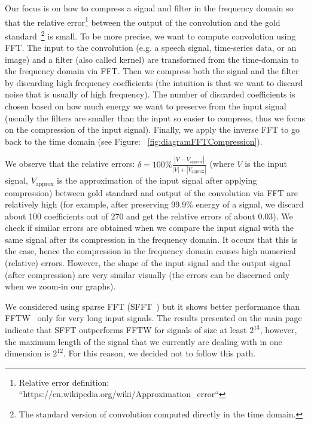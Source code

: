 \label{sec:compression}
Our focus is on how to compress a signal and filter in the frequency domain so that the relative error\footnote{Relative error definition:\\ ``https://en.wikipedia.org/wiki/Approximation\_error``} between the output of the convolution and the gold standard~\footnote{The standard version of convolution computed directly in the time domain.} is small. To be more precise, we want to compute convolution using FFT. The input to the convolution (e.g. a speech signal, time-series data, or an image) and a filter (also called kernel) are transformed from the time-domain to the frequency domain via FFT. Then we compress both the signal and the filter by discarding high frequency coefficients (the intuition is that we want to discard noise that is usually of high frequency). The number of discarded coefficients is chosen based on how much energy we want to preserve from the input signal (usually the filters are smaller than the input so easier to compress, thus we focus on the compression of the input signal). Finally, we apply the inverse FFT to go back to the time domain (see Figure: ~\ref{fig:diagramFFTCompression}).

We observe that the relative errors: $\delta = 100\% \frac{|V - V_{\mathrm{approx}}|}{|V| + |V_{\mathrm{approx}}|}$ (where $V$ is the input signal, $V_{\mathrm{approx}}$ is the approximation of the input signal after applying compression)  between gold standard and output of the convolution via FFT are relatively high (for example, after preserving 99.9\% energy of a signal, we discard about 100 coefficients out of 270 and get the relative errors of about 0.03). We check if similar errors are obtained when we compare the input signal with the same signal after its compression in the frequency domain. It occurs that this is the case, hence the compression in the frequency domain causes high numerical (relative) errors. However, the shape of the input signal and the output signal (after compression) are very similar visually (the errors can be discerned only when we zoom-in our graphs).

We considered using sparse FFT (SFFT~\cite{sparsefft}) but it shows better performance than FFTW~\cite{fftw} only for very long input signals. The results presented on the main page~\cite{sparsefft} indicate that SFFT outperforms FFTW for signals of size at least $2^{13}$, however, the maximum length of the signal that we currently are dealing with in one dimension is $2^{12}$. For this reason, we decided not to follow this path.

